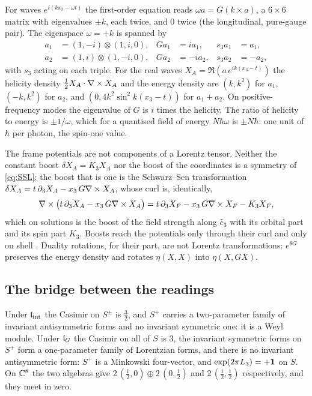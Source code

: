 \begin{example}
\label{ex:Gcharge}
For waves $e^{i(k x_3-\omega t)}$ the first-order equation reads $\omega a=G(k\times a)$, a $6\times6$ matrix with eigenvalues $\pm k$, each
twice, and $0$ twice (the longitudinal, pure-gauge pair). The eigenspace $\omega=+k$ is spanned by
\[
\begin{aligned}
a_1&=(1,-i)\otimes(1,i,0), & Ga_1&=ia_1, & s_3a_1&=a_1,\\
a_2&=(1,i)\otimes(1,-i,0), & Ga_2&=-ia_2, & s_3a_2&=-a_2,
\end{aligned}
\]
with $s_3$ acting on each triple. For the real waves $X_A=\Re(a\,e^{ik(x_3-t)})$ the helicity density $\tfrac12X_A\cdot\nabla\times X_A$ and the
energy density are $(k,k^2)$ for $a_1$, $(-k,k^2)$ for $a_2$, and $(0,4k^2\sin^2k(x_3-t))$ for $a_1+a_2$. On positive-frequency modes the
eigenvalue of $G$ is $i$ times the helicity. The ratio of helicity to energy is $\pm1/\omega$, which for a quantised field of energy
$N\hbar\omega$ is $\pm N\hbar$: one unit of $\hbar$ per photon, the spin-one value.
\end{example}

The frame potentials are not components of a Lorentz tensor. Neither the constant boost $\delta X_A=K_3X_A$ nor the boost of the
coordinates is a symmetry of \eqref{eq:SSL}; the boost that is one is the Schwarz--Sen transformation $\delta X_A=t\,\partial_3X_A-x_3\,G\nabla\times
X_A$, whose curl is, identically,
\[
\nabla\times\bigl(t\,\partial_3X_A-x_3\,G\nabla\times X_A\bigr)=t\,\partial_3X_F-x_3\,G\nabla\times X_F-K_3X_F ,
\]
which on solutions is the boost of the field strength along $\hat e_3$ with its orbital part and its spin part $K_3$. Boosts reach the
potentials only through their curl and only on shell \cite{SchwarzSen94}. Duality rotations, for their part, are not Lorentz
transformations: $e^{\theta G}$ preserves the energy density and rotates $\eta(X,X)$ into $\eta(X,GX)$.

\subsection{The bridge between the readings}
\label{sec:bridge}

\begin{proposition}
\label{prop:halfspinors}
Under $\mathfrak l_{\rm int}$ the Casimir on $S^\pm$ is $\tfrac32$, and $S^+$ carries a two-parameter family of invariant antisymmetric forms and no
invariant symmetric one: it is a Weyl module. Under $\mathfrak l_G$ the Casimir on all of $S$ is $3$, the invariant symmetric forms on $S^+$ form a
one-parameter family of Lorentzian forms, and there is no invariant antisymmetric form: $S^+$ is a Minkowski four-vector, and
$\exp(2\pi L_3)=+\mathbf 1$ on $S$. On $\mathbb{C}^8$ the two algebras give $2\,(\tfrac12,0)\oplus2\,(0,\tfrac12)$ and $2\,(\tfrac12,\tfrac12)$
respectively, and they meet in zero.
\end{proposition}

